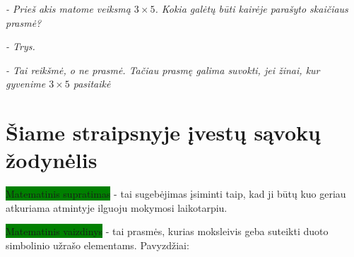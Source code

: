 \documentclass[a4paper]{article}
\begin{document}
\tableofcontents
\newpage
\textit{- Prieš akis matome veiksmą $3\times 5$. Kokia galėtų būti kairėje parašyto skaičiaus prasmė?}

\textit{- Trys.}

\textit{- Tai reikšmė, o ne prasmė. Tačiau prasmę galima suvokti, jei žinai, kur gyvenime $3\times 5$ pasitaikė}

\section{Šiame straipsnyje įvestų sąvokų žodynėlis}

\colorbox{green}{Matematinis supratimas} - tai sugebėjimas  įsiminti taip, kad ji būtų kuo geriau atkuriama atmintyje ilguoju mokymosi laikotarpiu.

\colorbox{green}{Matematinis vaizdinys} - tai prasmės, kurias moksleivis geba suteikti duoto simbolinio užrašo elementams. Pavyzdžiai:
\end{document}
